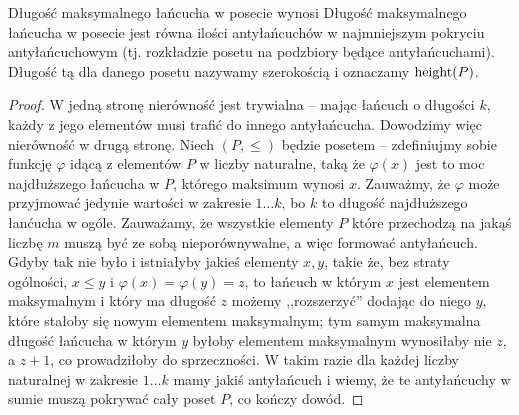 \begin{theorem}
	Długość maksymalnego łańcucha w posecie wynosi
	Długość maksymalnego łańcucha w posecie jest równa ilości antyłańcuchów w najmniejszym pokryciu antyłańcuchowym
	(tj. rozkładzie posetu na podzbiory będące antyłańcuchami).
	Długość tą dla danego posetu nazywamy szerokością i oznaczamy $\text{height}(P)$.
\end{theorem}

\begin{proof}
	W jedną stronę nierówność jest trywialna -- mając łańcuch o długości $k$, każdy z jego
	elementów musi trafić do innego antyłańcucha. Dowodzimy więc nierówność w drugą stronę.
	Niech $(P, \leq)$ będzie posetem -- zdefiniujmy sobie funkcję $\varphi$ idącą z elementów
	$P$ w liczby naturalne, taką że $\varphi(x)$ jest to moc najdłuższego łańcucha w $P$,
	którego maksimum wynosi $x$. Zauważmy, że $\varphi$ może przyjmować jedynie wartości
	w zakresie $1 \dots k$, bo $k$ to długość najdłuższego łanćucha w ogóle. Zauważamy,
	że wszystkie elementy $P$ które przechodzą na jakąś liczbę $m$ muszą być ze sobą
	nieporównywalne, a więc formować antyłańcuch. Gdyby tak nie było i istniałyby jakieś
	elementy $x, y$, takie że, bez straty ogólności, $x \leq y$ i
	$\varphi(x) = \varphi(y) = z$, to łańcuch w którym $x$ jest elementem maksymalnym
	i który ma długość $z$ możemy ,,rozszerzyć'' dodając do niego $y$, które stałoby się
	nowym elementem maksymalnym; tym samym maksymalna długość łańcucha w którym $y$
	byłoby elementem maksymalnym wynosiłaby nie $z$, a $z+1$, co prowadziłoby do sprzeczności.
	W takim razie dla każdej liczby naturalnej w zakresie $1 \dots k$ mamy jakiś antyłańcuch
	i wiemy, że te antyłańcuchy w sumie muszą pokrywać cały poset $P$, co kończy dowód.
\end{proof}
